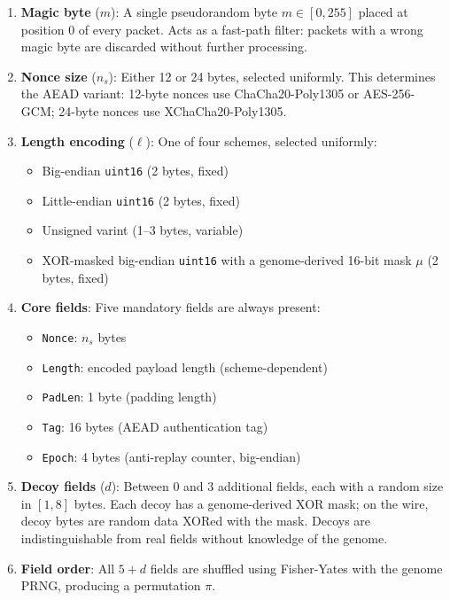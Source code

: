 \documentclass[11pt,a4paper]{article}
\newcommand{\field}[1]{\texttt{#1}}
\begin{document}
\begin{enumerate}
  \item \textbf{Magic byte} ($m$): A single pseudorandom byte $m \in [0, 255]$ placed at position 0 of every packet. Acts as a fast-path filter: packets with a wrong magic byte are discarded without further processing.

  \item \textbf{Nonce size} ($n_s$): Either 12 or 24 bytes, selected uniformly. This determines the AEAD variant: 12-byte nonces use ChaCha20-Poly1305 or AES-256-GCM; 24-byte nonces use XChaCha20-Poly1305.

  \item \textbf{Length encoding} ($\ell$): One of four schemes, selected uniformly:
  \begin{itemize}[nosep]
    \item Big-endian \texttt{uint16} (2 bytes, fixed)
    \item Little-endian \texttt{uint16} (2 bytes, fixed)
    \item Unsigned varint (1--3 bytes, variable)
    \item XOR-masked big-endian \texttt{uint16} with a genome-derived 16-bit mask $\mu$ (2 bytes, fixed)
  \end{itemize}

  \item \textbf{Core fields}: Five mandatory fields are always present:
  \begin{itemize}[nosep]
    \item \field{Nonce}: $n_s$ bytes
    \item \field{Length}: encoded payload length (scheme-dependent)
    \item \field{PadLen}: 1 byte (padding length)
    \item \field{Tag}: 16 bytes (AEAD authentication tag)
    \item \field{Epoch}: 4 bytes (anti-replay counter, big-endian)
  \end{itemize}

  \item \textbf{Decoy fields} ($d$): Between 0 and 3 additional fields, each with a random size in $[1, 8]$ bytes. Each decoy has a genome-derived XOR mask; on the wire, decoy bytes are random data XORed with the mask. Decoys are indistinguishable from real fields without knowledge of the genome.

  \item \textbf{Field order}: All $5 + d$ fields are shuffled using Fisher-Yates with the genome PRNG, producing a permutation $\pi$.


\end{enumerate}
\end{document}
